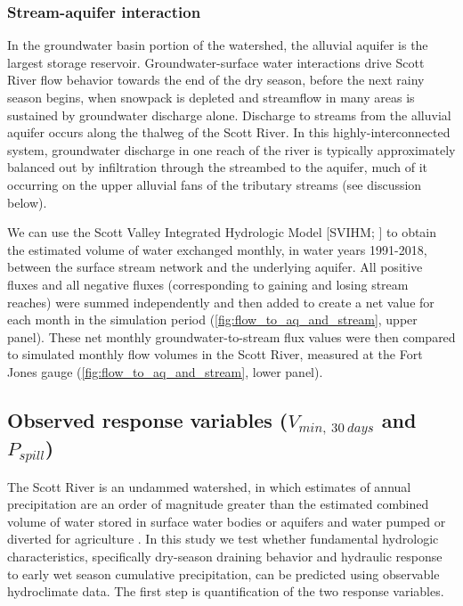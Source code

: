 \documentclass[hess, manuscript]{copernicus}
\begin{document}
\subsubsection{Stream-aquifer interaction}

In the groundwater basin portion of the watershed, the alluvial aquifer
is the largest storage reservoir. Groundwater-surface water interactions
drive Scott River flow behavior towards the end of the dry season,
before the next rainy season begins, when snowpack is depleted and
streamflow in many areas is sustained by groundwater discharge alone.
Discharge to streams from the alluvial aquifer occurs along the thalweg
of the Scott River. In this highly-interconnected system, groundwater
discharge in one reach of the river is typically approximately balanced
out by infiltration through the streambed to the aquifer, much of it
occurring on the upper alluvial fans of the tributary streams (see
discussion below).

We can use the Scott Valley Integrated Hydrologic Model {[}SVIHM;
\citet{Tolley2019}{]} to obtain the estimated volume of water exchanged
monthly, in water years 1991-2018, between the surface stream network
and the underlying aquifer. All positive fluxes and all negative fluxes
(corresponding to gaining and losing stream reaches) were summed
independently and then added to create a net value for each month in the
simulation period (\autoref{fig:flow_to_aq_and_stream}, upper panel).
These net monthly groundwater-to-stream flux values were then compared
to simulated monthly flow volumes in the Scott River, measured at the
Fort Jones gauge (\autoref{fig:flow_to_aq_and_stream}, lower panel).

\subsection{\texorpdfstring{Observed response variables
(\(V_{min,~30~days}\) and
\(P_{spill}\))}{Observed response variables (V\_\{min,\textasciitilde30\textasciitilde days\} and P\_\{spill\})}}

The Scott River is an undammed watershed, in which estimates of annual
precipitation are an order of magnitude greater than the estimated
combined volume of water stored in surface water bodies or aquifers and
water pumped or diverted for agriculture \citep{Tolley2019}. In this
study we test whether fundamental hydrologic characteristics,
specifically dry-season draining behavior and hydraulic response to
early wet season cumulative precipitation, can be predicted using
observable hydroclimate data. The first step is quantification of the
two response variables.
\end{document}
